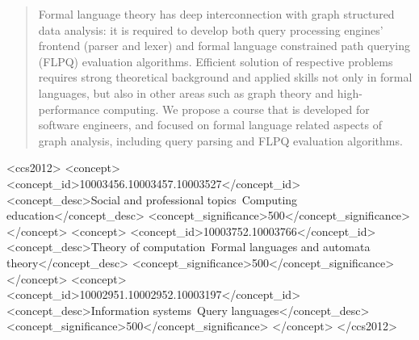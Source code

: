 \documentclass[sigconf]{acmart}
\begin{document}
\begin{abstract}
  Formal language theory has deep interconnection with graph structured data analysis: it is required to develop both query processing engines' frontend (parser and lexer) and formal language constrained path querying (FLPQ) evaluation algorithms.
  Efficient solution of respective problems requires strong theoretical background and applied skills not only in formal languages, but also in other areas such as graph theory and high-performance computing.
  We propose a course that is developed for software engineers, and focused on formal language related aspects of graph analysis, including query parsing and FLPQ evaluation algorithms.
\end{abstract}

\begin{CCSXML}
<ccs2012>
  <concept>
      <concept_id>10003456.10003457.10003527</concept_id>
      <concept_desc>Social and professional topics~Computing education</concept_desc>
      <concept_significance>500</concept_significance>
      </concept>
  <concept>
      <concept_id>10003752.10003766</concept_id>
      <concept_desc>Theory of computation~Formal languages and automata theory</concept_desc>
      <concept_significance>500</concept_significance>
      </concept>
  <concept>
      <concept_id>10002951.10002952.10003197</concept_id>
      <concept_desc>Information systems~Query languages</concept_desc>
      <concept_significance>500</concept_significance>
      </concept>
</ccs2012>
\end{CCSXML}



\maketitle
\end{document}
